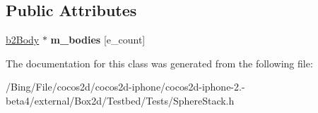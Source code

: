 \subsection*{Public Attributes}
\begin{DoxyCompactItemize}
\item 
\hypertarget{class_sphere_stack_a7f063d1f3c344a861ce7b45a53a9a472}{\hyperlink{classb2_body}{b2\-Body} $\ast$ {\bfseries m\-\_\-bodies} \mbox{[}e\-\_\-count\mbox{]}}\label{class_sphere_stack_a7f063d1f3c344a861ce7b45a53a9a472}

\end{DoxyCompactItemize}


The documentation for this class was generated from the following file\-:\begin{DoxyCompactItemize}
\item 
/\-Bing/\-File/cocos2d/cocos2d-\/iphone/cocos2d-\/iphone-\/2.-\/beta4/external/\-Box2d/\-Testbed/\-Tests/Sphere\-Stack.\-h\end{DoxyCompactItemize}
